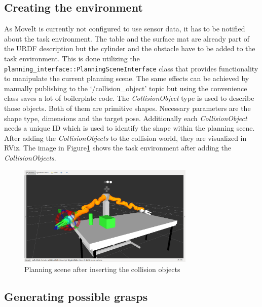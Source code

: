 \subsection{Creating the environment}

As MoveIt is currently not configured to use sensor data, it has to be notified about the task environment. The table and the surface mat are already part of the URDF description but the cylinder and the obstacle have to be added to the task environment. This is done utilizing the \texttt{planning\_interface::PlanningSceneInterface} class that provides functionality to manipulate the current planning scene. The same effects can be achieved by manually publishing to the `/collision\_object' topic but using the convenience class saves a lot of boilerplate code. The \emph{CollisionObject} type is used to describe those objects. Both of them are primitive shapes. Necessary parameters are the shape type, dimensions and the target pose. Additionally each \emph{CollisionObject} needs a unique ID which is used to identify the shape within the planning scene. After adding the \emph{CollisionObjects} to the collision world, they are visualized in RViz. The image in Figure\ref{fig:task_env} shows the task environment after adding the \emph{CollisionObjects}.

\begin{figure}[ht]
	\centering
  	\includegraphics[width=0.75\textwidth]{images/task_env.png}
	\caption{Planning scene after inserting the collision objects}
	\label{fig:task_env}
\end{figure}

\subsection{Generating possible grasps}

